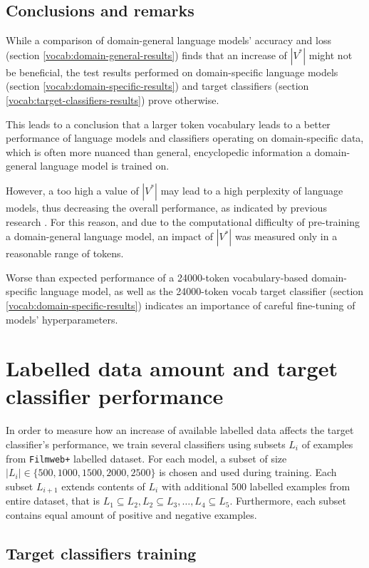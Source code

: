 \subsection{Conclusions and remarks}

While a comparison of domain-general language models' accuracy and loss (section \ref{vocab:domain-general-results}) finds that an increase of $|V^*|$ might not be beneficial, the test results performed on domain-specific language models (section \ref{vocab:domain-specific-results}) and target classifiers (section \ref{vocab:target-classifiers-results}) prove otherwise. 

This leads to a conclusion that a larger token vocabulary leads to a better performance of language models and classifiers operating on domain-specific data, which is often more nuanced than general, encyclopedic information a domain-general language model is trained on. 

However, a too high a value of $|V^*|$  may lead to a high perplexity of language models, thus decreasing the overall performance, as indicated by previous research \cite{czaplakardas:ulmfit}. For this reason, and due to the computational difficulty of pre-training a domain-general language model, an impact of $|V^*|$ was measured only in a reasonable range of tokens.

Worse than expected performance of a 24000-token vocabulary-based domain-specific language model, as well as the 24000-token vocab target classifier (section \ref{vocab:domain-specific-results}) indicates an importance of careful fine-tuning of models' hyperparameters. 

\section{Labelled data amount and target classifier performance}

In order to measure how an increase of available labelled data affects the target classifier's performance, we train several classifiers using subsets $L_i$ of examples from \lstinline{Filmweb+} labelled dataset. For each model, a subset of size $|L_i| \in \{500, 1000, 1500, 2000, 2500\}$ is chosen and used during training. Each subset $L_{i+1}$ extends contents of $L_i$ with additional 500 labelled examples from entire dataset, that is $L_1 \subseteq L_2, L_2 \subseteq L_3,\dots, L_4 \subseteq L_5$. Furthermore, each subset contains equal amount of positive and negative examples.

\subsection{Target classifiers training}

